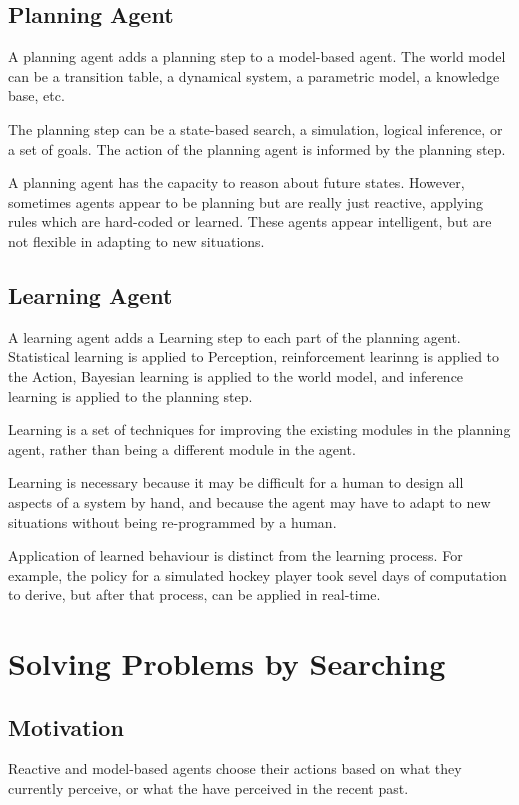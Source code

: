 \section{Planning Agent}
A planning agent adds a planning step to a model-based agent. The world model
can be a transition table, a dynamical system, a parametric model, a knowledge
base, etc.

The planning step can be a state-based search, a simulation, logical inference,
or a set of goals. The action of the planning agent is informed by the planning
step.

A planning agent has the capacity to reason about future states. However,
sometimes agents appear to be planning but are really just reactive, applying
rules which are hard-coded or learned. These agents appear intelligent, but are
not flexible in adapting to new situations.

\section{Learning Agent}
A learning agent adds a Learning step to each part of the planning agent.
Statistical learning is applied to Perception, reinforcement learinng is
applied to the Action, Bayesian learning is applied to the world model, and
inference learning is applied to the planning step.

Learning is a set of techniques for improving the existing modules in the
planning agent, rather than being a different module in the agent.

Learning is necessary because it may be difficult for a human to design all
aspects of a system by hand, and because the agent may have to adapt to new
situations without being re-programmed by a human.

Application of learned behaviour is distinct from the learning process. For
example, the policy for a simulated hockey player took sevel days of
computation to derive, but after that process, can be applied in real-time.

\chapter{Solving Problems by Searching}
\section{Motivation}
Reactive and model-based agents choose their actions based on what they
currently perceive, or what the have perceived in the recent past.

